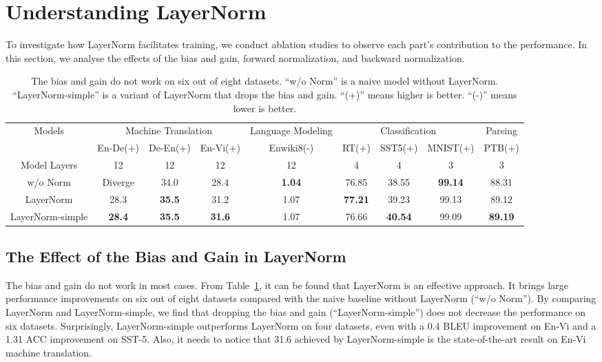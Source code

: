 \documentclass{article}
\begin{document}
  
  



  
\section{Understanding LayerNorm}
To investigate how LayerNorm facilitates training, we conduct ablation studies to
observe each part's contribution to the performance. In this section, we analyse the effects of the bias and gain, forward normalization, and backward normalization.


\begin{table}[h]
\small
\setlength{\tabcolsep}{2.5pt}
\centering
\caption{ The bias and gain do not work on six out of eight datasets.  ``w/o Norm'' is a naive model without LayerNorm. ``LayerNorm-simple'' is a variant of LayerNorm that drops the bias and gain. ``(+)'' means higher is better. ``(-)'' means lower is better. }
  \scalebox{0.95}
    {
 \begin{tabular}{c|ccc|c|ccc|c}
  \toprule  \multirow{2}{*}{Models}&\multicolumn{3}{c|}{Machine Translation} &\multicolumn{1}{c|}{Language Modeling} &\multicolumn{3}{c|}{ Classification}  & Parsing  \\
  \cmidrule{2-9}
 & En-De(+) & De-En(+) & En-Vi(+) & Enwiki8(-) & RT(+)  & SST5(+) &  MNIST(+) & PTB(+) \\
    \midrule   Model Layers  & 12 & 12 & 12 & 12 & 4 & 4 & 3 & 3\\
   \midrule   w/o Norm  &Diverge & 34.0 & 28.4 & \textbf{1.04} & 76.85 & 38.55 & \textbf{99.14} &88.31\\ 
  LayerNorm  & 28.3 & \textbf{35.5} &  31.2& 1.07 & \textbf{77.21} & 39.23   & 99.13 & 89.12\\
  


  LayerNorm-simple  & \textbf{28.4} & \textbf{35.5} & \textbf{31.6} &1.07 & 76.66 & 
  \textbf{40.54} & 99.09 & \textbf{89.19}\\



  \bottomrule \end{tabular}}
  
  \label{tab:bias}
  \end{table}


\subsection{The Effect of the Bias and Gain in LayerNorm }
The bias and gain do not work in most cases. From Table~\ref{tab:bias},
it can be found that LayerNorm is an effective approach. It brings large performance improvements on six out of eight datasets compared with the naive baseline without LayerNorm (``w/o Norm''). By comparing LayerNorm and LayerNorm-simple, we find that dropping the bias and gain (``LayerNorm-simple'') does not  decrease the performance on six datasets. Surprisingly, LayerNorm-simple  outperforms LayerNorm on four datasets, even with a 0.4 BLEU improvement on En-Vi and a 1.31 ACC improvement on SST-5. Also, it needs to notice that 31.6 achieved by LayerNorm-simple is the state-of-the-art result on En-Vi machine translation. 
\end{document}
